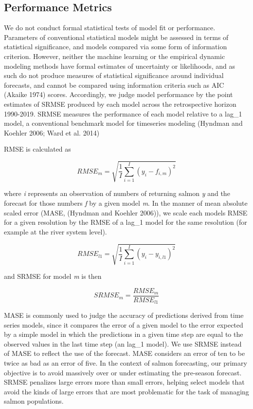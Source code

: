 \documentclass[
]{article}
\begin{document}
\hypertarget{performance-metrics}{%
\subsection*{Performance Metrics}\label{performance-metrics}}

We do not conduct formal statistical tests of model fit or performance. Parameters of conventional statistical models might be assessed in terms of statistical significance, and models compared via some form of information criterion. However, neither the machine learning or the empirical dynamic modeling methods have formal estimates of uncertainty or likelihoods, and as such do not produce measures of statistical significance around individual forecasts, and cannot be compared using information criteria such as AIC (Akaike 1974) scores. Accordingly, we judge model performance by the point estimates of SRMSE produced by each model across the retrospective horizon 1990-2019. SRMSE measures the performance of each model relative to a lag\_1 model, a conventional benchmark model for timeseries modeling (Hyndman and Koehler 2006; Ward et al. 2014)

RMSE is calculated as

\[RMSE_m = \sqrt{\frac{1}{I}\sum\limits_{i = 1}^I(y_{i} - f_{i,m})^2}\]

where \emph{i} represents an observation of numbers of returning salmon \emph{y} and the forecast for those numbers \emph{f} by a given model \emph{m}. In the manner of mean absolute scaled error (MASE, (Hyndman and Koehler 2006)), we scale each models RMSE for a given resolution by the RMSE of a lag\_1 model for the same resolution (for example at the river system level).

\[RMSE_{l1} = \sqrt{\frac{1}{I}\sum\limits_{i = 1}^I(y_{i} - y_{i,l1})^2}\]

and SRMSE for model \emph{m} is then

\[SRMSE_m = \frac{RMSE_m}{RMSE_{l1}}\]

MASE is commonly used to judge the accuracy of predictions derived from time series models, since it compares the error of a given model to the error expected by a simple model in which the predictions in a given time step are equal to the observed values in the last time step (an lag\_1 model). We use SRMSE instead of MASE to reflect the use of the forecast. MASE considers an error of ten to be twice as bad as an error of five. In the context of salmon forecasting, our primary objective is to avoid massively over or under estimating the pre-season forecast. SRMSE penalizes large errors more than small errors, helping select models that avoid the kinds of large errors that are most problematic for the task of managing salmon populations.
\end{document}
